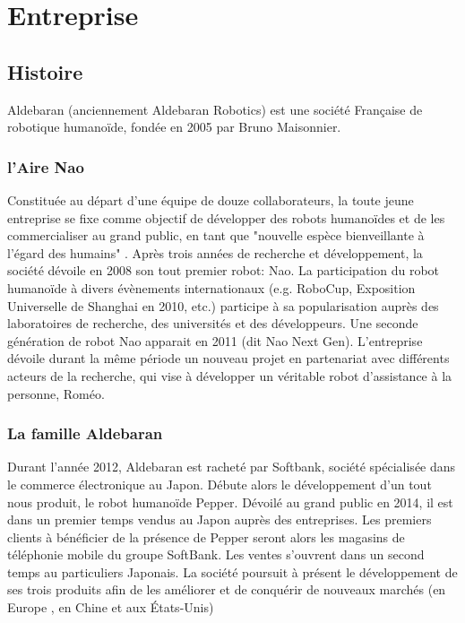 \chapter*{Entreprise}
\label{Entreprise}
\thispagestyle{fancy}

\section{Histoire}
\label{Entreprise: histoire}
Aldebaran (anciennement Aldebaran Robotics) est une société Française de robotique humanoïde, fondée en 2005 par Bruno Maisonnier. 

\subsection{l'Aire Nao}
\label{Entreprise:Histoire:Nao}
Constituée au départ d'une équipe de douze collaborateurs, la toute jeune entreprise se fixe comme objectif de développer des robots humanoïdes et de les commercialiser au grand public, en tant que "nouvelle espèce bienveillante à l'égard des humains" . Après trois années de recherche et développement, la société dévoile en 2008 son tout premier robot: Nao. La participation du robot humanoïde à divers évènements internationaux (e.g. RoboCup, Exposition Universelle de Shanghai en 2010, etc.) participe à sa popularisation auprès des laboratoires de recherche, des universités et des développeurs. Une seconde génération de robot Nao apparait en 2011 (dit Nao Next Gen). L'entreprise dévoile durant la même période un nouveau projet en partenariat avec différents acteurs de la recherche,  qui vise à développer un véritable robot d'assistance à la personne, Roméo. 

\subsection{La famille Aldebaran}
\label{Entreprise: La famille Aldebaran}
Durant l'année 2012, Aldebaran est racheté par Softbank, société spécialisée dans le commerce électronique au Japon. Débute alors le développement d'un tout nous produit, le robot humanoïde Pepper. Dévoilé au grand public en 2014, il est dans un premier temps vendus au Japon auprès des entreprises. Les premiers clients à bénéficier de la présence de Pepper seront alors les magasins de téléphonie mobile du groupe SoftBank. Les ventes s'ouvrent dans un second temps au particuliers Japonais. La société poursuit à présent le développement de ses trois produits afin de les améliorer et de conquérir de nouveaux marchés (en Europe , en Chine et aux États-Unis)

